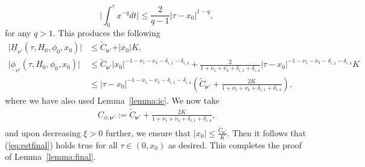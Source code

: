 \documentclass[reqno,12pt]{amsart}
\renewcommand{\eqref}[1]{(\ref{eq:#1})}
\newcommand{\lemmaref}[1]{Lemma~\ref{lemma:#1}}
\numberwithin{equation}{section}
\begin{document}
$$ \bigg\vert \int_{0}^\tau \underline x^{-q} dt\bigg \vert \le \frac{2}{q-1} \vert \tau-x_0\vert^{1-q},$$  for any $q>1$. This produces the following
\begin{align*}
 \vert \underline H_{\nu'}(\tau,H_0,\phi_0,x_0)\vert &\le \widetilde  C_{\mathbf \nu'}+\vert x_0\vert K,\\
 \vert \underline \phi_{\nu'}(\tau,H_0,\phi_0,x_0)\vert  &\le \widetilde  C_{\mathbf \nu'}\vert x_0\vert^{-1-\nu_1-\nu_4-\delta_{i,1}-\delta_{i,4}} + \frac{2}{1+\nu_1+\nu_4+\delta_{i,1}+\delta_{i,4}} \vert \tau-x_0\vert^{-1-\nu_1-\nu_4-\delta_{i,1}-\delta_{i,4}} K\\
 &\le \vert \tau-x_0\vert^{-1-\nu_1-\nu_4-\delta_{i,1}-\delta_{i,4}} \left(\widetilde  C_{\mathbf \nu'}+\frac{2K}{1+\nu_1+\nu_4+\delta_{i,1}+\delta_{i,4}} \right),
\end{align*}
where we have also used \lemmaref{ic}. We now take 
\begin{align*}
 C_{\phi,\mathbf \nu'}:=\widetilde  C_{\mathbf \nu'}+\frac{2K}{1+\nu_1+\nu_4+\delta_{i,1}+\delta_{i,4}},
\end{align*}
and upon decreasing $\xi>0$ further, we ensure that $\vert x_0\vert \le \frac{\widetilde  C_{\mathbf \nu'}}{ K}$.  
Then it follows that \eqref{estfinal} holds true for all $\tau\in (0,x_0)$
as desired. This completes the proof of \lemmaref{final}.




\end{document}
